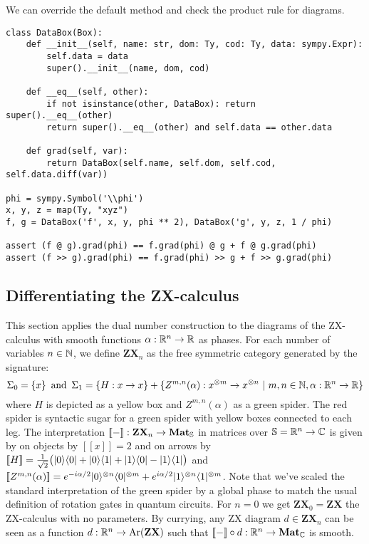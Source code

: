 \begin{example}
We can override the default  method and check the product rule for diagrams.

\begin{verbatim}
class DataBox(Box):
    def __init__(self, name: str, dom: Ty, cod: Ty, data: sympy.Expr):
        self.data = data
        super().__init__(name, dom, cod)

    def __eq__(self, other):
        if not isinstance(other, DataBox): return super().__eq__(other)
        return super().__eq__(other) and self.data == other.data

    def grad(self, var):
        return DataBox(self.name, self.dom, self.cod, self.data.diff(var))

phi = sympy.Symbol('\\phi')
x, y, z = map(Ty, "xyz")
f, g = DataBox('f', x, y, phi ** 2), DataBox('g', y, z, 1 / phi)

assert (f @ g).grad(phi) == f.grad(phi) @ g + f @ g.grad(phi)
assert (f >> g).grad(phi) == f.grad(phi) >> g + f >> g.grad(phi)
\end{verbatim}
\end{example}

\subsection{Differentiating the ZX-calculus}\label{2b-differentiating-zx}

This section applies the dual number construction to the diagrams of the ZX-calculus with smooth functions $\alpha : \R^n \to \R$ as phases.
For each number of variables $n \in \N$, we define $\mathbf{ZX}_n$ as the free symmetric category generated by the signature:
$$\Sigma_0 = \{ x \} \s \text{and} \s \Sigma_1 = \{ H : x \to x \} + \{ Z^{m, n}(\alpha) : x^{\otimes m} \to x^{\otimes n} \ \vert \ m, n \in \N, \alpha : \R^n \to \R \}$$
where $H$ is depicted as a yellow box and $Z^{m, n}(\alpha)$ as a green spider.
The red spider is syntactic sugar for a green spider with yellow boxes connected to each leg.
The interpretation $[\![-]\!]  : \mathbf{ZX}_n \to \mathbf{Mat}_\S$ in matrices over $\S = \R^n \to \C$ is given by on objects by $[\![ x ]\!] = 2$ and on arrows by
$[\![ H ]\!] = \frac{1}{\sqrt{2}} \big(\ket{0}\bra{0} + \ket{0}\bra{1} + \ket{1}\bra{0} - \ket{1}\bra{1}\big)$
and $[\![Z^{m, n}(\alpha)]\!] =
e^{-i \alpha / 2} \ket{0}^{\otimes n} \bra{0}^{\otimes m}
+ e^{i \alpha / 2} \ket{1}^{\otimes n} \bra{1}^{\otimes m}$.
Note that we've scaled the standard interpretation of the green spider by a global phase to match the usual definition of rotation gates in quantum circuits.
For $n = 0$ we get $\mathbf{ZX}_0 = \mathbf{ZX}$ the ZX-calculus with no parameters.
By currying, any ZX diagram $d \in \mathbf{ZX}_n$ can be seen as a function $d : \R^n \to \text{Ar}(\mathbf{ZX})$ such that $[\![-]\!] \circ d : \R^n \to \mathbf{Mat}_\C$ is smooth.

